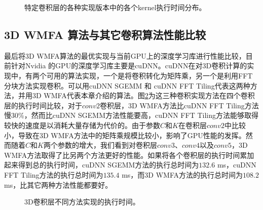 \begin{figure}[tbh]%
\centering
{}
\caption{特定卷积层的各种实现版本中的各个kernel执行时间分布。}
\label{result2}
\end{figure}

\subsection{3D WMFA 算法与其它卷积算法性能比较}
最后将3D WMFA算法的最优实现与当前GPU上的深度学习库进行性能比较，目前针对Nvidia 的GPU的深度学习库主要是cuDNN。cuDNN在对3D卷积计算的实现中，有两个可用的算法实现，一个是将卷积转化为矩阵乘，另一个是利用FFT 分块方法实现卷积。可以用cuDNN SGEMM 和 cuDNN FFT Tiling代表这两种方法，并用3D  WMFA代表本章介绍的算法。图\ref{result3}为这三种卷积实现方法在四个卷积层的执行时间比较，对于$conv2$卷积层，3D WMFA方法比cuDNN FFT Tiling方法慢$30$\%，然而比cuDNN SGEMM方法性能要高，cuDNN FFT Tiling方法能够取得较快的速度是以消耗大量存储为代价的。由于参数$C$和$K$在卷积层$conv2$中比较小，导致在3D WMFA方法中的矩阵乘规模比较小，影响了GPU性能的发挥。然而随着$C$和$K$两个参数的增大，我们看到对卷积层$conv3$、$conv4$以及$conv5$，3D WMFA方法取得了比另两个方法更好的性能。如果将各个卷积层的执行时间累加起来得到总的执行时间，cuDNN SGEMM方法的执行总时间为$132.6$ ms，cuDNN FFT Tiling方法的执行总时间为$135.4$ ms，而3D WMFA方法的执行总时间为$108.2$ ms，比其它两种方法性能都要好。

\begin{figure}[tbh]%
\centering
{}
\caption{3D卷积层不同方法实现的执行时间。}
\label{result3}
\end{figure}


